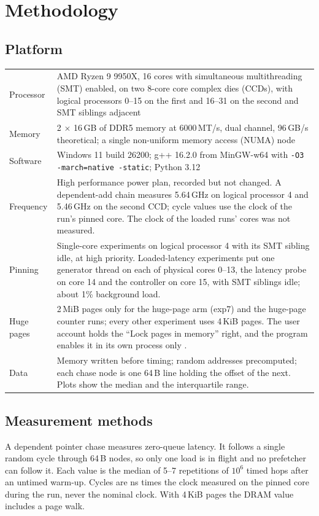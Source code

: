 \documentclass{article}
\begin{document}
\section{Methodology}\label{sec:method}
\subsection{Platform}\label{sec:platform}
{\small
\begin{longtable}{p{2.6cm}p{13.4cm}}
\toprule
Processor & AMD Ryzen 9 9950X, 16 cores with simultaneous multithreading (SMT) enabled, on two 8-core core complex dies (CCDs), with logical processors 0--15 on the first and 16--31 on the second and SMT siblings adjacent \\
Memory & 2 $\times$ 16\,GB of DDR5 memory at 6000\,MT/s, dual channel, 96\,GB/s theoretical; a single non-uniform memory access (NUMA) node \\
Software & Windows 11 build 26200; g++ 16.2.0 from MinGW-w64 with \texttt{-O3 -march=native -static}; Python 3.12 \\
Frequency & High performance power plan, recorded but not changed. A dependent-add chain measures 5.64\,GHz on logical processor 4 and 5.46\,GHz on the second CCD; cycle values use the clock of the run's pinned core. The clock of the loaded runs' cores was not measured. \\
Pinning & Single-core experiments on logical processor 4 with its SMT sibling idle, at high priority. Loaded-latency experiments put one generator thread on each of physical cores 0--13, the latency probe on core 14 and the controller on core 15, with SMT siblings idle; about 1\% background load. \\
Huge pages & 2\,MiB pages only for the huge-page arm (exp7) and the huge-page counter runs; every other experiment uses 4\,KiB pages. The user account holds the ``Lock pages in memory'' right, and the program enables it in its own process only \cite{mslarge}. \\
Data & Memory written before timing; random addresses precomputed; each chase node is one 64\,B line holding the offset of the next. Plots show the median and the interquartile range. \\
\bottomrule
\end{longtable}
}

\subsection{Measurement methods}\label{sec:methods}
A dependent pointer chase measures zero-queue latency. It follows a single random cycle through 64\,B nodes, so only one load is in flight and no prefetcher can follow it. Each value is the median of 5--7 repetitions of $10^6$ timed hops after an untimed warm-up. Cycles are ns times the clock measured on the pinned core during the run, never the nominal clock. With 4\,KiB pages the DRAM value includes a page walk.
\end{document}
